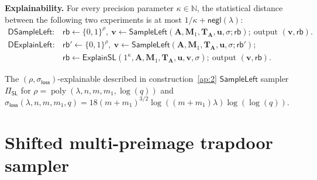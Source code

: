 \begin{definition}
\textbf{Explainability.} For every precision parameter $\kappa\in\mathbb N$, the statistical distance between the following two experiments is at most $1/\kappa+\mathsf{negl}(\lambda)$:
$$
\begin{array}{ll}
\mathsf{DSampleLeft}:&
\mathsf{rb}\leftarrow\{0,1\}^{\rho},\
\mathbf v\leftarrow
\mathsf{SampleLeft}(\mathbf A,\mathbf M_1,\mathbf T_{\mathbf A},\mathbf u,\sigma;\mathsf{rb});
\ \text{output }(\mathbf v,\mathsf{rb}).
\\[0.5em]
\mathsf{DExplainLeft}:&
\mathsf{rb}'\leftarrow\{0,1\}^{\rho},\
\mathbf v\leftarrow
\mathsf{SampleLeft}(\mathbf A,\mathbf M_1,\mathbf T_{\mathbf A},\mathbf u,\sigma;\mathsf{rb}');
\\
&
\mathsf{rb}\leftarrow
\mathsf{ExplainSL}(1^\kappa,\mathbf A,\mathbf M_1,\mathbf T_{\mathbf A},\mathbf u,\mathbf v,\sigma);
\ \text{output }(\mathbf v,\mathsf{rb}).
\end{array}
$$
\end{definition}

\begin{theorem}
\label{the:explainable}
The $(\rho,\sigma_{\mathsf{loss}})$-explainable described in construction~\ref{ap:2}
$\mathsf{SampleLeft}$ sampler $\Pi_{\mathsf{SL}}$ for
$
    \rho = \operatorname{poly}(\lambda,n,m,m_1,\log(q))
$
and
$
    \sigma_{\mathsf{loss}}(\lambda,n,m,m_1,q)
    =
    18(m+m_1)^{3/2}
    \log((m+m_1)\lambda)
    \log(\log(q)).
$
\end{theorem}



\section{Shifted multi-preimage trapdoor sampler}

